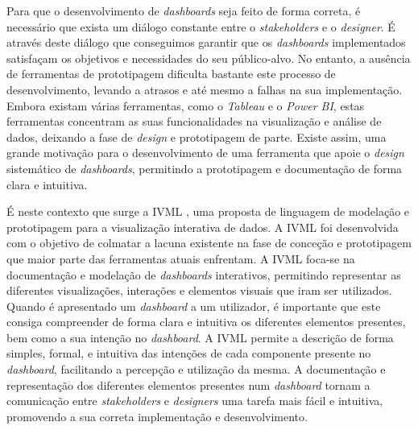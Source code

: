 Para que o desenvolvimento de \textit{dashboards} seja feito de forma correta, é necessário que exista um diálogo constante entre o \textit{stakeholders} e o \textit{designer}. É através deste diálogo que conseguimos garantir que os \textit{dashboards} implementados satisfaçam os objetivos e necessidades do seu público-alvo. No entanto, a ausência de ferramentas de prototipagem dificulta bastante este processo de desenvolvimento, levando a atrasos e até mesmo a falhas na sua implementação. Embora existam várias ferramentas, como o \textit{Tableau} e o \textit{Power BI}, estas ferramentas concentram as suas funcionalidades na visualização e análise de dados, deixando a fase de \textit{design} e prototipagem de parte. Existe assim, uma grande motivação para o desenvolvimento de uma ferramenta que apoie o \textit{design} sistemático de \textit{dashboards}, permitindo a prototipagem e documentação de forma clara e intuitiva.

É neste contexto que surge a \gls{IVML} \cite{Ferreira2023IVML}, uma proposta de linguagem de modelação e prototipagem para a visualização interativa de dados. A \gls{IVML} foi desenvolvida com o objetivo de colmatar a lacuna existente na fase de conceção e prototipagem que maior parte das ferramentas atuais enfrentam. A \gls{IVML} foca-se na documentação e modelação de \textit{dashboards} interativos, permitindo representar as diferentes visualizações, interações e elementos visuais que iram ser utilizados. Quando é apresentado um \textit{dashboard} a um utilizador, é importante que este consiga compreender de forma clara e intuitiva os diferentes elementos presentes, bem como a sua intenção no \textit{dashboard}. A \gls{IVML} permite a descrição de forma simples, formal, e intuitiva das intenções de cada componente presente no \textit{dashboard}, facilitando a percepção e utilização da mesma. A documentação e representação dos diferentes elementos presentes num \textit{dashboard} tornam a comunicação entre \textit{stakeholders} e \textit{designers} uma tarefa mais fácil e intuitiva, promovendo a sua correta implementação e desenvolvimento.

